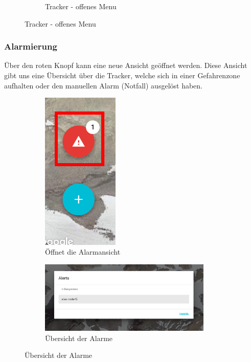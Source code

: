 \documentclass[11pt,english,german]{report}
\theoremstyle{definition}
\begin{document}
\begin{figure}[H]
\begin{subfigure}{.45\textwidth}
		\caption[Tracker - offenes Menu]
		{Tracker - offenes Menu}
	\end{subfigure}%
\end{figure}

\subsubsection{Alarmierung}
Über den roten Knopf kann eine neue Ansicht geöffnet werden. Diese Ansicht gibt uns eine Übersicht über die Tracker, welche sich in einer Gefahrenzone aufhalten oder den manuellen Alarm (Notfall) ausgelöst haben.
\begin{figure}[H]
	\centering
	\begin{subfigure}{.3\textwidth}
		\centering
		\includegraphics[width=0.4\textwidth]{img/atasweb/atas-web-alertbutton.png}
		\caption[Knopf zum öffnen der Alarmansicht]
		{Öffnet die Alarmansicht}
	\end{subfigure}%
	\begin{subfigure}{.65\textwidth}
		\centering
		\includegraphics[width=0.9\textwidth]{img/atasweb/atas-web-alertoverview.png}
		\caption[Übersicht der Alarme]
		{Übersicht der Alarme}
	\end{subfigure}%
\end{figure}
\end{document}
